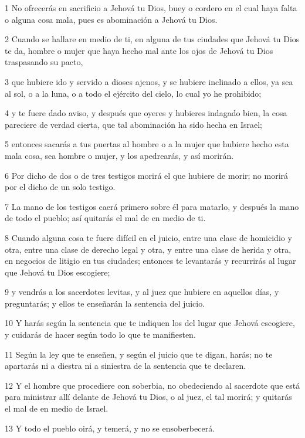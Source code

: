 \par 1 No ofrecerás en sacrificio a Jehová tu Dios, buey o cordero en el cual haya falta o alguna cosa mala, pues es abominación a Jehová tu Dios.
\par 2 Cuando se hallare en medio de ti, en alguna de tus ciudades que Jehová tu Dios te da, hombre o mujer que haya hecho mal ante los ojos de Jehová tu Dios traspasando su pacto,
\par 3 que hubiere ido y servido a dioses ajenos, y se hubiere inclinado a ellos, ya sea al sol, o a la luna, o a todo el ejército del cielo, lo cual yo he prohibido;
\par 4 y te fuere dado aviso, y después que oyeres y hubieres indagado bien, la cosa pareciere de verdad cierta, que tal abominación ha sido hecha en Israel;
\par 5 entonces sacarás a tus puertas al hombre o a la mujer que hubiere hecho esta mala cosa, sea hombre o mujer, y los apedrearás, y así morirán.
\par 6 Por dicho de dos o de tres testigos morirá el que hubiere de morir; no morirá por el dicho de un solo testigo.
\par 7 La mano de los testigos caerá primero sobre él para matarlo, y después la mano de todo el pueblo; así quitarás el mal de en medio de ti.
\par 8 Cuando alguna cosa te fuere difícil en el juicio, entre una clase de homicidio y otra, entre una clase de derecho legal y otra, y entre una clase de herida y otra, en negocios de litigio en tus ciudades; entonces te levantarás y recurrirás al lugar que Jehová tu Dios escogiere;
\par 9 y vendrás a los sacerdotes levitas, y al juez que hubiere en aquellos días, y preguntarás; y ellos te enseñarán la sentencia del juicio.
\par 10 Y harás según la sentencia que te indiquen los del lugar que Jehová escogiere, y cuidarás de hacer según todo lo que te manifiesten.
\par 11 Según la ley que te enseñen, y según el juicio que te digan, harás; no te apartarás ni a diestra ni a siniestra de la sentencia que te declaren.
\par 12 Y el hombre que procediere con soberbia, no obedeciendo al sacerdote que está para ministrar allí delante de Jehová tu Dios, o al juez, el tal morirá; y quitarás el mal de en medio de Israel.
\par 13 Y todo el pueblo oirá, y temerá, y no se ensoberbecerá.

